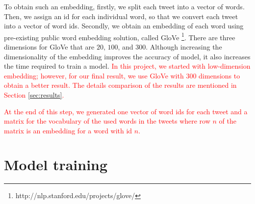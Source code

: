 \documentclass[8pt,conference,compsocconf]{IEEEtran}
\begin{document}
To obtain such an embedding, firstly, we split each tweet into a vector of words. Then, we assign an id for each individual word, so that we convert each tweet into a vector of word ids. Secondly, we obtain an embedding of each word using pre-existing public word embedding solution, called GloVe \footnote{http://nlp.stanford.edu/projects/glove/}. There are three dimensions for GloVe that are $20$, $100$, and $300$. Although increasing the dimensionality of the embedding improves the accuracy of model, it also increases the time required to train a model. \textcolor{red}{In this project, we started with low-dimension embedding; however, for our final result, we use GloVe with $300$ dimensions to obtain a better result. The details comparison of the results are mentioned in Section \ref{sec:results}.}

\textcolor{red}{At the end of this step, we generated one vector of word ids for each tweet and a matrix for the vocabulary of the used words in the tweets where row $n$ of the matrix is an embedding for a word with id $n$.}

\section{Model training}\label{sec:model}
\end{document}
